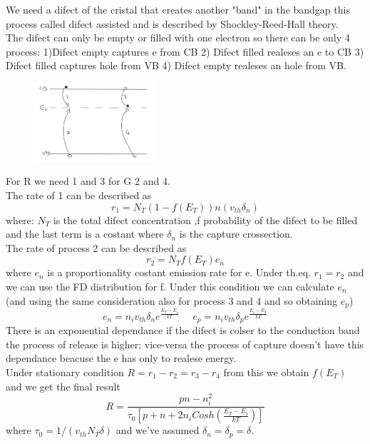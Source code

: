 We need a difect of the cristal that creates another "band" in the bandgap this process called difect assisted and is described by Shockley-Reed-Hall theory.\\
The difect can only be empty or filled with one electron so there can be only 4 process: 1)Difect empty captures e from CB   2) Difect filled realeses an e to CB 3) Difect filled captures hole from VB 4) Difect empty realeses an hole from VB.

\begin{figure}
\includegraphics[width=0.4\textwidth]{srhp2.png}
\end{figure}

For R we need 1 and 3 for G 2 and 4.\\
The rate of 1 can be described as 
\begin{equation}
r_1=N_T(1-f(E_T))n(v_{th} \delta_n)
\end{equation}
where: $N_T$ is the total difect concentration ,f probability of the difect to be filled and the last term is a costant where $\delta_n$ is the capture crossection.\\
The rate of process 2 can be described as 
\begin{equation}
r_2=N_Tf(E_T)e_n
\end{equation}
where $e_n$ is a proportionality costant emission rate for e.
Under th.eq. $r_1=r_2$ and we can use the FD distribution for f. Under this condition we can calculate $e_n$ (and using the same consideration also for process 3 and 4 and so obtaining $e_p$)
\begin{equation}
e_n=n_iv_{th}\delta_ne^{\frac{E_T-E_i}{kT}} \ \ \ \ \ \ e_p=n_iv_{th}\delta_pe^{\frac{E_i-E_T}{kT}}
\end{equation}
There is an exponential dependance if the difect is colser to the conduction band the process of release is higher; vice-versa the process of capture doesn't have this dependance beacuse the e has only to realese energy.\\
Under stationary condition $R=r_1-r_2=r_3-r_4$ from this we obtain $f(E_T)$ and we get the final result 
\begin{equation}
R=\frac{pn-n_i^2}{\tau_0\left[p+n+2n_iCosh(\frac{E_T-E_i}{kT})\right]}
\end{equation}
where $\tau_0=1/(v_{th}N_T\delta)$ and we've assumed $\delta_n=\delta_p=\delta$.\\

